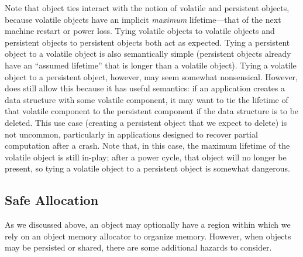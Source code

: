 Note that object ties interact with the notion of volatile and persistent objects, because
volatile objects have an implicit \emph{maximum} lifetime---that of the next machine restart or
power loss. Tying volatile objects to volatile objects and persistent objects to persistent objects both act as
expected. Tying a persistent object to a volatile object is also semantically simple (persistent
objects already have an ``assumed lifetime'' that is longer than a volatile object). Tying a
volatile object to a persistent object, however, may seem somewhat nonsensical. However, \Twizzler
does still allow this because it has useful semantics: if an application creates a data structure
with some volatile component,
it may want to tie the lifetime of that volatile component to the
persistent component if the data structure is to be deleted. This use case (creating a persistent
object that we expect to delete) is not uncommon, particularly in applications designed to recover
partial computation after a crash. Note that, in this case, the maximum
lifetime of the volatile object is still in-play; after a power cycle, that object will no longer be
present, so tying a volatile object to a persistent object is somewhat dangerous.


\subsection{Safe Allocation}

As we discussed above, an object may optionally have a region within which we rely on an object memory allocator to
organize memory. However, when objects may be persisted or shared, there are some additional hazards to consider.

